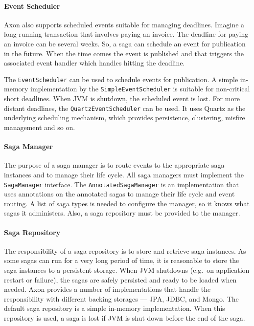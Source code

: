 \documentclass{book}
\begin{document}
\paragraph{Event Scheduler}\label{event-scheduler}

Axon also supports scheduled events suitable for managing deadlines.
Imagine a long-running transaction that involves paying an invoice. The
deadline for paying an invoice can be several weeks. So, a saga can
schedule an event for publication in the future. When the time comes the
event is published and that triggers the associated event handler which
handles hitting the deadline.

The \texttt{EventScheduler} can be used to schedule events for
publication. A simple in-memory implementation by the
\texttt{SimpleEventScheduler} is suitable for non-critical short
deadlines. When JVM is shutdown, the scheduled event is lost. For more
distant deadlines, the \texttt{QuartzEventScheduler} can be used. It
uses Quartz as the underlying scheduling mechanism, which provides
persistence, clustering, misfire management and so on.

\paragraph{Saga Manager}\label{saga-manager}

The purpose of a saga manager is to route events to the appropriate saga
instances and to manage their life cycle. All saga managers must
implement the \texttt{SagaManager} interface. The
\texttt{AnnotatedSagaManager} is an implementation that uses annotations
on the annotated sagas to manage their life cycle and event routing. A
list of saga types is needed to configure the manager, so it knows what
sagas it administers. Also, a saga repository must be provided to the
manager.

\paragraph{Saga Repository}\label{saga-repository}

The responsibility of a saga repository is to store and retrieve saga
instances. As some sagas can run for a very long period of time, it is
reasonable to store the saga instances to a persistent storage. When JVM
shutdowns (e.g.~on application restart or failure), the sagas are safely
persisted and ready to be loaded when needed. Axon provides a number of
implementations that handle the responsibility with different backing
storages --- JPA, JDBC, and Mongo. The default saga repository is a
simple in-memory implementation. When this repository is used, a saga is
lost if JVM is shut down before the end of the saga.
\end{document}
